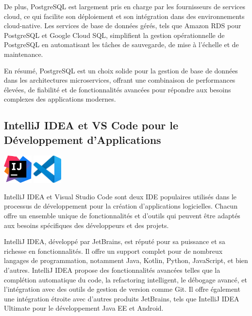 \documentclass[a4paper, 11pt, openany]{report}
\begin{document}
De plus, PostgreSQL est largement pris en charge par les fournisseurs de services cloud, ce qui facilite son déploiement et son intégration dans des environnements cloud-native. Les services de base de données gérés, tels que Amazon RDS pour PostgreSQL et Google Cloud SQL, simplifient la gestion opérationnelle de PostgreSQL en automatisant les tâches de sauvegarde, de mise à l'échelle et de maintenance.

En résumé, PostgreSQL est un choix solide pour la gestion de base de données dans les architectures microservices, offrant une combinaison de performances élevées, de fiabilité et de fonctionnalités avancées pour répondre aux besoins complexes des applications modernes.



\subsection{IntelliJ IDEA et VS Code pour le Développement d'Applications}
\begin{center}
\includegraphics[height=1.5cm]{intellij.png}
\includegraphics[height=1.5cm]{vscode.jpg}
\end{center}

IntelliJ IDEA et Visual Studio Code sont deux IDE populaires utilisés dans le processus de développement pour la création d'applications logicielles. Chacun offre un ensemble unique de fonctionnalités et d'outils qui peuvent être adaptés aux besoins spécifiques des développeurs et des projets.

IntelliJ IDEA, développé par JetBrains, est réputé pour sa puissance et sa richesse en fonctionnalités. Il offre un support complet pour de nombreux langages de programmation, notamment Java, Kotlin, Python, JavaScript, et bien d'autres. IntelliJ IDEA propose des fonctionnalités avancées telles que la complétion automatique du code, la refactoring intelligent, le débogage avancé, et l'intégration avec des outils de gestion de version comme Git. Il offre également une intégration étroite avec d'autres produits JetBrains, tels que IntelliJ IDEA Ultimate pour le développement Java EE et Android.
\end{document}
